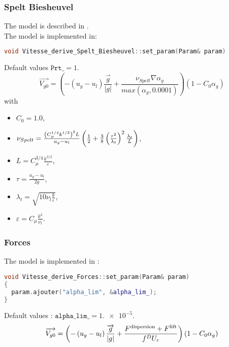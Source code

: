 \subsubsection{Spelt Biesheuvel}
The model is described in \textcite{Spelt1997}.\\
The model is implemented in:
\begin{lstlisting}[language=c++]
void Vitesse_derive_Spelt_Biesheuvel::set_param(Param& param)
\end{lstlisting}
Default values  $\texttt{Prt\_} = 1.$\\
\begin{equation}
  \vec{V_{g0}} =(-(u_g-u_l)\frac{\vec{g}}{|g|}+\frac{\nu_{Spelt}\nabla \alpha_g}{max(\alpha_g,0.0001)})(1-C_0\alpha_g)
\end{equation}
with
\begin{itemize}
    \item[\small \textcolor{blue}{\ding{109}}] $C_0=1.0$,
    \item[\small \textcolor{blue}{\ding{109}}]$\nu_{Spelt}=\frac{\left( C_\mu^{1/4}k^{1/2} \right)^2L }{u_g-u_l}\left( \frac{1}{2}+\frac{3}{8}\left( \frac{\tau^2}{\lambda_t} \right)^2\frac{\lambda_t}{L} \right)$,
    \item[\small \textcolor{blue}{\ding{109}}]$L=C_\mu^{3/4}\frac{k^{3/2}}{\varepsilon}$,
    \item[\small \textcolor{blue}{\ding{109}}]$\tau=\frac{u_g-u_l}{2g}$,
    \item[\small \textcolor{blue}{\ding{109}}]$\lambda_t=\sqrt{10\nu_l\frac{k}{\varepsilon}}$,
    \item[\small \textcolor{blue}{\ding{109}}]$\varepsilon=C_\mu \frac{k^2}{\nu_t}$.

\end{itemize}

\subsubsection{Forces}
The model is implemented in :
\begin{lstlisting}[language=c++]
void Vitesse_derive_Forces::set_param(Param& param)
{
  param.ajouter("alpha_lim", &alpha_lim_);
}
\end{lstlisting}
Default values : $\texttt{alpha\_lim\_}=\num{1.e-5}$.\\
\begin{equation}
  \overrightarrow{V_{g0}} =\left( -\left( u_g-u_l \right)\frac{\overrightarrow{g}}{|g|}+\frac{F^{\text{dispersion}}+F^{\text{lift}}}{f^DU_r} \right)\left( 1-C_0\alpha_g \right)
\end{equation}

